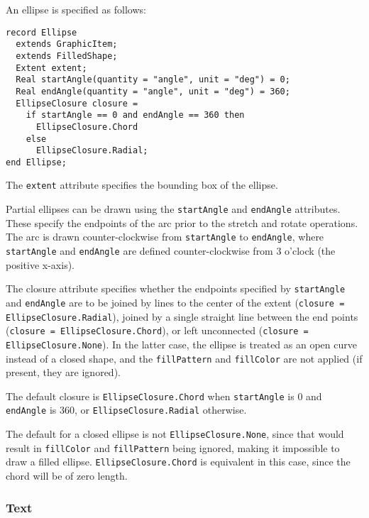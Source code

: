 An ellipse is specified as follows:
\begin{lstlisting}[language=modelica]
record Ellipse
  extends GraphicItem;
  extends FilledShape;
  Extent extent;
  Real startAngle(quantity = "angle", unit = "deg") = 0;
  Real endAngle(quantity = "angle", unit = "deg") = 360;
  EllipseClosure closure =
    if startAngle == 0 and endAngle == 360 then
      EllipseClosure.Chord
    else
      EllipseClosure.Radial;
end Ellipse;
\end{lstlisting}%
The \lstinline!extent! attribute specifies the bounding box of the ellipse.

Partial ellipses can be drawn using the \lstinline!startAngle! and \lstinline!endAngle! attributes.
These specify the endpoints of the arc prior to the stretch and rotate operations.
The arc is drawn counter-clockwise from \lstinline!startAngle! to \lstinline!endAngle!, where \lstinline!startAngle! and \lstinline!endAngle! are defined counter-clockwise from 3 o'clock (the positive x-axis).

The closure attribute specifies whether the endpoints specified by \lstinline!startAngle! and \lstinline!endAngle! are to be joined by lines to the center of the extent (\lstinline!closure = EllipseClosure.Radial!), joined by a single straight line between the end points (\lstinline!closure = EllipseClosure.Chord!), or left unconnected (\lstinline!closure = EllipseClosure.None!).
In the latter case, the ellipse is treated as an open curve instead of a closed shape, and the \lstinline!fillPattern! and \lstinline!fillColor! are not applied (if present, they are ignored).

The default closure is \lstinline!EllipseClosure.Chord! when \lstinline!startAngle! is 0 and \lstinline!endAngle! is 360, or \lstinline!EllipseClosure.Radial! otherwise.

\begin{nonnormative}
The default for a closed ellipse is not \lstinline!EllipseClosure.None!, since that would result in \lstinline!fillColor! and \lstinline!fillPattern! being ignored, making it impossible to draw a filled ellipse.
\lstinline!EllipseClosure.Chord! is equivalent in this case, since the chord will be of zero length.
\end{nonnormative}

\subsubsection{Text}\label{text}

